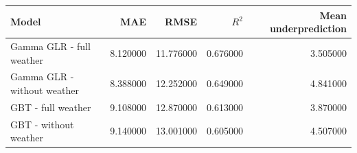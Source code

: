 \begin{tabular}{lrrrr}
\toprule
Model & MAE & RMSE & $R^2$ & Mean underprediction \\
\midrule
Gamma GLR - full weather & 8.120000 & 11.776000 & 0.676000 & 3.505000 \\
Gamma GLR - without weather & 8.388000 & 12.252000 & 0.649000 & 4.841000 \\
GBT - full weather & 9.108000 & 12.870000 & 0.613000 & 3.870000 \\
GBT - without weather & 9.140000 & 13.001000 & 0.605000 & 4.507000 \\
\bottomrule
\end{tabular}
